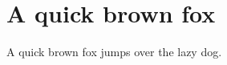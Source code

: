 \chapter{A quick brown fox}
\label{chap:quick_brown_fox}

A quick brown fox jumps over the lazy dog.